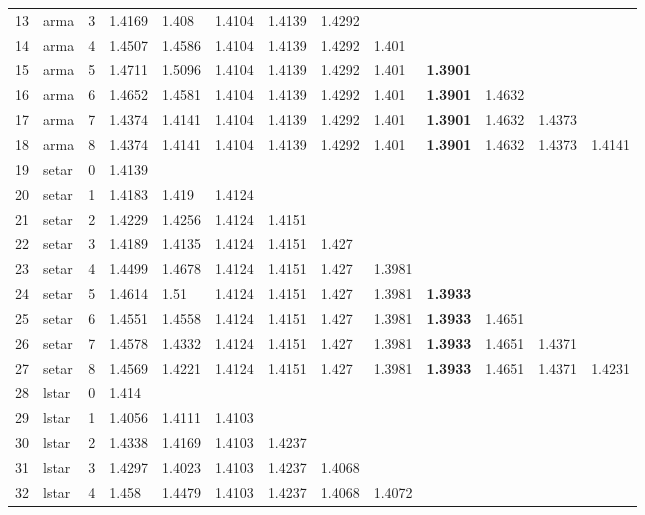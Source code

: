 \documentclass[10pt,a4paper]{article}
\begin{document}
\begin{table}[ht]
\begin{tabular}{rlrllllllllll}
  13 & arma &     3 & 1.4169 & 1.408 & 1.4104 & 1.4139 & 1.4292 &  &  &  &  &  \\ 
  14 & arma &     4 & 1.4507 & 1.4586 & 1.4104 & 1.4139 & 1.4292 & 1.401 &  &  &  &  \\ 
  15 & arma &     5 & 1.4711 & 1.5096 & 1.4104 & 1.4139 & 1.4292 & 1.401 & \textbf{1.3901} &  &  &  \\ 
  16 & arma &     6 & 1.4652 & 1.4581 & 1.4104 & 1.4139 & 1.4292 & 1.401 & \textbf{1.3901} & 1.4632 &  &  \\ 
  17 & arma &     7 & 1.4374 & 1.4141 & 1.4104 & 1.4139 & 1.4292 & 1.401 & \textbf{1.3901} & 1.4632 & 1.4373 &  \\ 
  18 & arma &     8 & 1.4374 & 1.4141 & 1.4104 & 1.4139 & 1.4292 & 1.401 & \textbf{1.3901} & 1.4632 & 1.4373 & 1.4141 \\ 
   \hline
19 & setar &     0 & 1.4139 &  &  &  &  &  &  &  &  &  \\ 
  20 & setar &     1 & 1.4183 & 1.419 & 1.4124 &  &  &  &  &  &  &  \\ 
  21 & setar &     2 & 1.4229 & 1.4256 & 1.4124 & 1.4151 &  &  &  &  &  &  \\ 
  22 & setar &     3 & 1.4189 & 1.4135 & 1.4124 & 1.4151 & 1.427 &  &  &  &  &  \\ 
  23 & setar &     4 & 1.4499 & 1.4678 & 1.4124 & 1.4151 & 1.427 & 1.3981 &  &  &  &  \\ 
  24 & setar &     5 & 1.4614 & 1.51 & 1.4124 & 1.4151 & 1.427 & 1.3981 & \textbf{1.3933} &  &  &  \\ 
  25 & setar &     6 & 1.4551 & 1.4558 & 1.4124 & 1.4151 & 1.427 & 1.3981 & \textbf{1.3933} & 1.4651 &  &  \\ 
  26 & setar &     7 & 1.4578 & 1.4332 & 1.4124 & 1.4151 & 1.427 & 1.3981 & \textbf{1.3933} & 1.4651 & 1.4371 &  \\ 
  27 & setar &     8 & 1.4569 & 1.4221 & 1.4124 & 1.4151 & 1.427 & 1.3981 & \textbf{1.3933} & 1.4651 & 1.4371 & 1.4231 \\ 
   \hline
28 & lstar &     0 & 1.414 &  &  &  &  &  &  &  &  &  \\ 
  29 & lstar &     1 & 1.4056 & 1.4111 & 1.4103 &  &  &  &  &  &  &  \\ 
  30 & lstar &     2 & 1.4338 & 1.4169 & 1.4103 & 1.4237 &  &  &  &  &  &  \\ 
  31 & lstar &     3 & 1.4297 & 1.4023 & 1.4103 & 1.4237 & 1.4068 &  &  &  &  &  \\ 
  32 & lstar &     4 & 1.458 & 1.4479 & 1.4103 & 1.4237 & 1.4068 & 1.4072 &  &  &  &  \\ 

\end{tabular}
\end{table}
\end{document}
